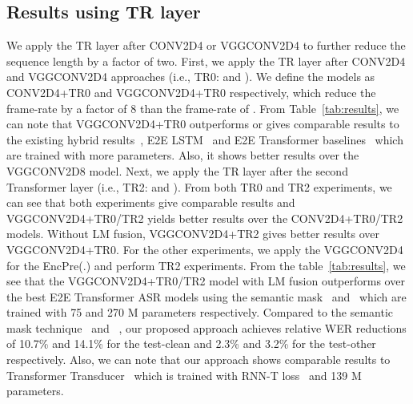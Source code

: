 \documentclass{article}
\begin{document}
\subsection{Results using TR layer}
We apply the TR layer after CONV2D4 or VGGCONV2D4 to further reduce the sequence length by a factor of two. 
First, we apply the TR layer after CONV2D4 and VGGCONV2D4 approaches (i.e., TR0:  and ). We define the models as CONV2D4+TR0 and VGGCONV2D4+TR0 respectively, which reduce the frame-rate by a factor of 8 than the frame-rate of .
From Table~\ref{tab:results}, 
we can note that VGGCONV2D4+TR0 outperforms or gives comparable results to the existing hybrid results~\citep{wang2020c,rwth}, E2E LSTM~\citep{specaugment} and E2E Transformer baselines~\citep{moritz2020,karita2019asru,e2e2020,wang2020a} which are trained with more parameters. Also, it shows better results over the VGGCONV2D8 model. 
Next, we apply the TR layer after the second Transformer layer (i.e., TR2:  and ).  From both TR0 and TR2 experiments, we can see that both experiments give comparable results and VGGCONV2D4+TR0/TR2 yields better results over the CONV2D4+TR0/TR2 models. Without LM fusion, VGGCONV2D4+TR2 gives better results over VGGCONV2D4+TR0. 
For the other experiments, we apply the VGGCONV2D4 for the EncPre(.) and perform TR2 experiments.
From the table~\ref{tab:results}, we see that the VGGCONV2D4+TR0/TR2 model with LM fusion outperforms over the best E2E Transformer ASR models  using the semantic mask~\citep{wang2020a} and~\citep{e2e2020} which are  trained with 75 and 270 M parameters respectively. Compared to the semantic mask technique~\citep{wang2020a} and ~\citep{e2e2020}, our proposed approach achieves relative WER reductions of 10.7\% and 14.1\% for the test-clean and 2.3\% and 3.2\% for the test-other respectively. 
Also, we can note that our approach shows comparable results to Transformer Transducer~\citep{transducer} which is trained with RNN-T loss~\citep{rnnt-loss} and 139 M parameters. 
\end{document}

